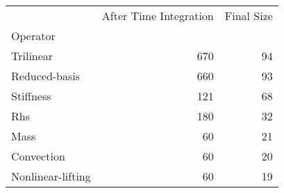 \begin{tabular}{lrr}
\toprule
{} &  After Time Integration &  Final Size \\
Operator          &                         &             \\
\midrule
Trilinear         &                     670 &          94 \\
Reduced-basis     &                     660 &          93 \\
Stiffness         &                     121 &          68 \\
Rhs               &                     180 &          32 \\
Mass              &                      60 &          21 \\
Convection        &                      60 &          20 \\
Nonlinear-lifting &                      60 &          19 \\
\bottomrule
\end{tabular}

